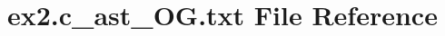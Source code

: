 \hypertarget{ex2_8c__ast__OG_8txt}{}\section{ex2.\+c\+\_\+ast\+\_\+\+O\+G.\+txt File Reference}
\label{ex2_8c__ast__OG_8txt}
